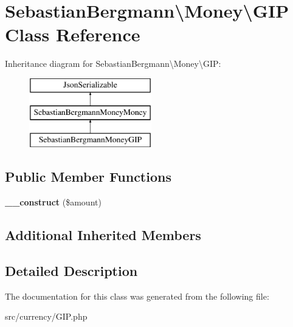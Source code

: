 \hypertarget{classSebastianBergmann_1_1Money_1_1GIP}{}\section{Sebastian\+Bergmann\textbackslash{}Money\textbackslash{}G\+I\+P Class Reference}
\label{classSebastianBergmann_1_1Money_1_1GIP}
Inheritance diagram for Sebastian\+Bergmann\textbackslash{}Money\textbackslash{}G\+I\+P\+:\begin{figure}[H]
\begin{center}
\leavevmode
\includegraphics[height=3.000000cm]{classSebastianBergmann_1_1Money_1_1GIP}
\end{center}
\end{figure}
\subsection*{Public Member Functions}
\begin{DoxyCompactItemize}
\item 
\hypertarget{classSebastianBergmann_1_1Money_1_1GIP_ae8248e2c0d8fda2d920eb94b8a4c62f9}{}{\bfseries \+\_\+\+\_\+construct} (\$amount)\label{classSebastianBergmann_1_1Money_1_1GIP_ae8248e2c0d8fda2d920eb94b8a4c62f9}

\end{DoxyCompactItemize}
\subsection*{Additional Inherited Members}


\subsection{Detailed Description}


The documentation for this class was generated from the following file\+:\begin{DoxyCompactItemize}
\item 
src/currency/G\+I\+P.\+php\end{DoxyCompactItemize}
